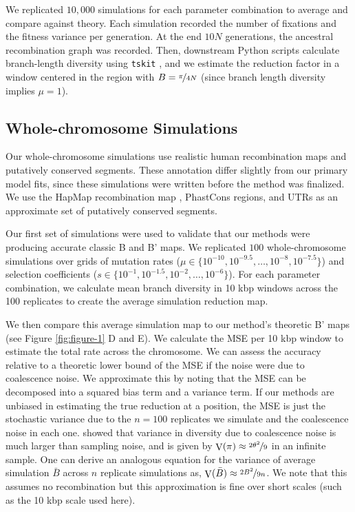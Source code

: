 \documentclass[11pt]{article}
\DeclareMathOperator{\var}{V}
\begin{document}
We replicated $10,000$ simulations for each parameter combination to average
and compare against theory. Each simulation recorded the number of fixations
and the fitness variance per generation. At the end $10N$ generations, the
ancestral recombination graph was recorded. Then, downstream Python scripts
calculate branch-length diversity using \texttt{tskit}
\parencite{Kelleher2018-qu}, and we estimate the reduction factor in a window
centered in the region with $B = \nicefrac{\pi}{4N}$ (since branch length
diversity implies $\mu=1$).

\subsection{Whole-chromosome Simulations}

Our whole-chromosome simulations use realistic human recombination maps and
putatively conserved segments. These annotation differ slightly from our
primary model fits, since these simulations were written before the method was
finalized. We use the HapMap recombination map
\parencite{International_HapMap_Consortium2007-nu}, PhastCons regions, and UTRs
as an approximate set of putatively conserved segments. 

Our first set of simulations were used to validate that our methods were
producing accurate classic B and B' maps. We replicated $100$ whole-chromosome
simulations over grids of mutation rates ($\mu \in \{10^{-10}, 10^{-9.5},
\ldots, 10^{-8}, 10^{-7.5}\}$) and selection coefficients ($s \in \{10^{-1},
10^{-1.5}, 10^{-2}, \ldots, 10^{-6}\}$). For each parameter combination, we
calculate mean branch diversity in 10 kbp windows across the 100 replicates to
create the average simulation reduction map. 

We then compare this average simulation map to our method's theoretic B' maps
(see Figure \ref{fig:figure-1} D and E). We calculate the MSE per 10 kbp window
to estimate the total rate across the chromosome. We can assess the accuracy
relative to a theoretic lower bound of the MSE if the noise were due to
coalescence noise. We approximate this by noting that the MSE can be decomposed
into a squared bias term and a variance term. If our methods are unbiased in
estimating the true reduction at a position, the MSE is just the stochastic
variance due to the $n=100$ replicates we simulate and the coalescence noise in
each one. \textcite{Tajima1983-gu} showed that variance in diversity due to
coalescence noise is much larger than sampling noise, and is given by
$\var(\pi) \approx \nicefrac{2\theta^2}{9}$ in an infinite sample. One can
derive an analogous equation for the variance of average simulation $\bar{B}$
across $n$ replicate simulations as, $\var(\bar{B}) \approx
\nicefrac{2B^2}{9n}$. We note that this assumes no recombination but this
approximation is fine over short scales (such as the 10 kbp scale used here).
\end{document}
